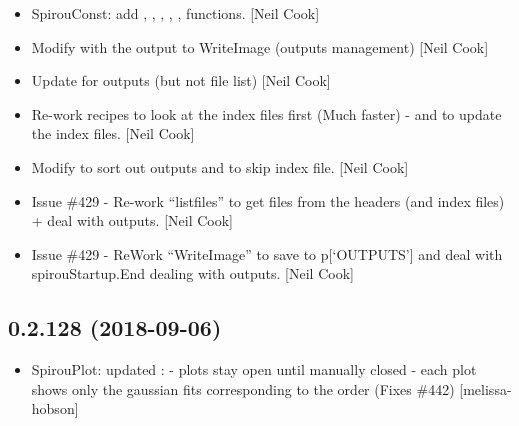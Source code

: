 \documentclass[a4paper,10pt,english]{report}
\begin{document}
\begin{itemize}
\item {} 
SpirouConst: add , ,
, , ,
 functions. {[}Neil Cook{]}

\item {} 
Modify  with the output to WriteImage (outputs management)
{[}Neil Cook{]}

\item {} 
Update  for outputs (but not file list) {[}Neil Cook{]}

\item {} 
Re-work  recipes to look at the index files first (Much
faster) - and to update the index files. {[}Neil Cook{]}

\item {} 
Modify  to sort out outputs and to skip index
file. {[}Neil Cook{]}

\item {} 
Issue \#429 - Re-work “listfiles” to get files from the headers (and
index files) + deal with outputs. {[}Neil Cook{]}

\item {} 
Issue \#429 - ReWork “WriteImage” to save to p{[}‘OUTPUTS’{]} and deal with
spirouStartup.End dealing with outputs. {[}Neil Cook{]}

\end{itemize}


\subsection{0.2.128 (2018-09-06)}
\label{\detokenize{misc/changelog:id334}}\begin{itemize}
\item {} 
SpirouPlot: updated : - plots stay open
until manually closed - each plot shows only the gaussian fits
corresponding to the order (Fixes \#442) {[}melissa-hobson{]}

\end{itemize}
\end{document}
